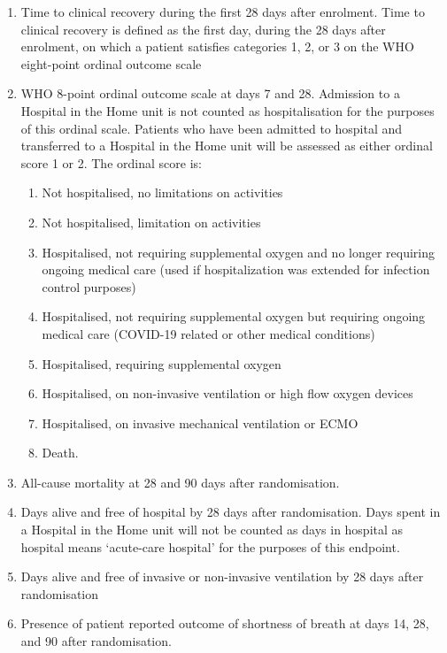 \documentclass[
  11pt,
]{article}
\providecommand{\tightlist}{%
  \setlength{\itemsep}{0pt}\setlength{\parskip}{0pt}}
\begin{document}
\begin{enumerate}
\def\labelenumi{\arabic{enumi}.}
\tightlist
\item
  Time to clinical recovery during the first 28 days after enrolment.
  Time to clinical recovery is defined as the first day, during the 28 days after enrolment, on which a patient satisfies categories 1, 2, or 3 on the WHO eight-point ordinal outcome scale
\item
  WHO 8-point ordinal outcome scale at days 7 and 28.
  Admission to a Hospital in the Home unit is not counted as hospitalisation for the purposes of this ordinal scale.
  Patients who have been admitted to hospital and transferred to a Hospital in the Home unit will be assessed as either ordinal score 1 or 2.
  The ordinal score is:

  \begin{enumerate}
  \def\labelenumii{\roman{enumii}.}
  \tightlist
  \item
    Not hospitalised, no limitations on activities
  \item
    Not hospitalised, limitation on activities
  \item
    Hospitalised, not requiring supplemental oxygen and no longer requiring ongoing medical care (used if hospitalization was extended for infection control purposes)
  \item
    Hospitalised, not requiring supplemental oxygen but requiring ongoing medical care (COVID-19 related or other medical conditions)
  \item
    Hospitalised, requiring supplemental oxygen
  \item
    Hospitalised, on non-invasive ventilation or high flow oxygen devices
  \item
    Hospitalised, on invasive mechanical ventilation or ECMO
  \item
    Death.
  \end{enumerate}
\item
  All-cause mortality at 28 and 90 days after randomisation.
\item
  Days alive and free of hospital by 28 days after randomisation.
  Days spent in a Hospital in the Home unit will not be counted as days in hospital as hospital means `acute-care hospital' for the purposes of this endpoint.
\item
  Days alive and free of invasive or non-invasive ventilation by 28 days after randomisation
\item
  Presence of patient reported outcome of shortness of breath at days 14, 28, and 90 after randomisation.


\end{enumerate}
\end{document}
